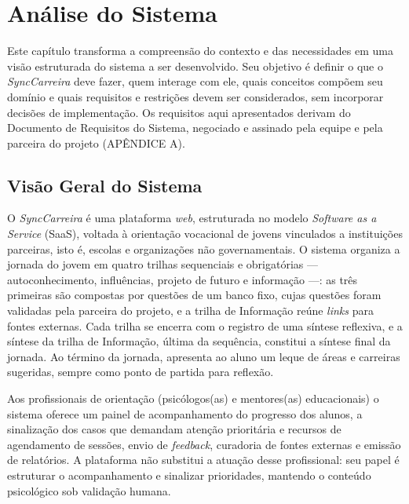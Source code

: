 \chapter{Análise do Sistema}\label{cap:analise}

Este capítulo transforma a compreensão do contexto e das necessidades em uma visão estruturada do sistema a ser desenvolvido. Seu objetivo é definir o que o \textit{SyncCarreira} deve fazer, quem interage com ele, quais conceitos compõem seu domínio e quais requisitos e restrições devem ser considerados, sem incorporar decisões de implementação. Os requisitos aqui apresentados derivam do Documento de Requisitos do Sistema, negociado e assinado pela equipe e pela parceira do projeto (APÊNDICE A).

\section{Visão Geral do Sistema}\label{sec:visao-geral}

O \textit{SyncCarreira} é uma plataforma \textit{web}, estruturada no modelo \textit{Software as a Service} (SaaS), voltada à orientação vocacional de jovens vinculados a instituições parceiras, isto é, escolas e organizações não governamentais. O sistema organiza a jornada do jovem em quatro trilhas sequenciais e obrigatórias --- autoconhecimento, influências, projeto de futuro e informação ---: as três primeiras são compostas por questões de um banco fixo, cujas questões foram validadas pela parceira do projeto, e a trilha de Informação reúne \textit{links} para fontes externas. Cada trilha se encerra com o registro de uma síntese reflexiva, e a síntese da trilha de Informação, última da sequência, constitui a síntese final da jornada. Ao término da jornada, apresenta ao aluno um leque de áreas e carreiras sugeridas, sempre como ponto de partida para reflexão.

Aos profissionais de orientação (psicólogos(as) e mentores(as) educacionais) o sistema oferece um painel de acompanhamento do progresso dos alunos, a sinalização dos casos que demandam atenção prioritária e recursos de agendamento de sessões, envio de \textit{feedback}, curadoria de fontes externas e emissão de relatórios. A plataforma não substitui a atuação desse profissional: seu papel é estruturar o acompanhamento e sinalizar prioridades, mantendo o conteúdo psicológico sob validação humana.

